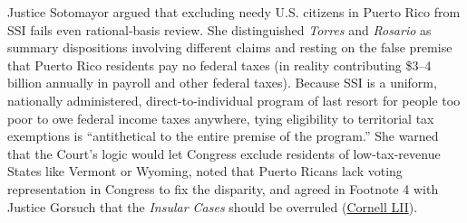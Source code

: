 \documentclass[12pt]{article}
\begin{document}
Justice Sotomayor argued that excluding needy U.S. citizens in Puerto Rico from SSI fails even rational-basis review. She distinguished \emph{Torres} and \emph{Rosario} as summary dispositions involving different claims and resting on the false premise that Puerto Rico residents pay no federal taxes (in reality contributing \$3--4 billion annually in payroll and other federal taxes). Because SSI is a uniform, nationally administered, direct-to-individual program of last resort for people too poor to owe federal income taxes anywhere, tying eligibility to territorial tax exemptions is ``antithetical to the entire premise of the program.'' She warned that the Court's logic would let Congress exclude residents of low-tax-revenue States like Vermont or Wyoming, noted that Puerto Ricans lack voting representation in Congress to fix the disparity, and agreed in Footnote 4 with Justice Gorsuch that the \emph{Insular Cases} should be overruled (\href{https://www.law.cornell.edu/supremecourt/text/20-303}{Cornell LII}).
\end{document}
